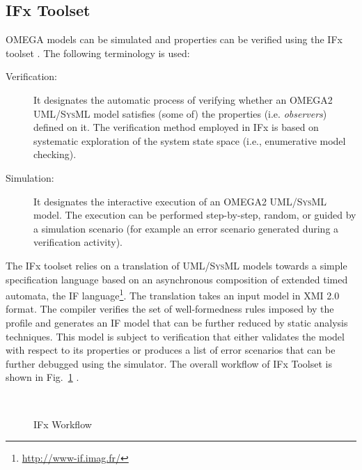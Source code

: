 \documentclass[a4paper,twoside]{article}
\def\sysml{\textsc{SysML}}
\def\uml{\textsc{UML}}
\begin{document}
\subsection{IFx Toolset}

\noindent OMEGA models can be simulated and properties can be verified using the IFx toolset \cite{test13}. The following terminology is used: 

\begin{description}
\item[Verification:] It designates  the  automatic  process  of  verifying  whether  an  OMEGA2  \uml{}/\sysml{} model  satisfies  (some  of)  the  properties  (i.e. \textit{observers})  defined  on  it.  The  verification  method employed in IFx is based on systematic exploration of the system state space (i.e., enumerative model checking). 
\item[Simulation:] It designates  the  interactive  execution  of  an  OMEGA2  \uml{}/\sysml{}  model.  The execution  can    be  performed  step-by-step,  random,  or  guided  by  a  simulation  scenario  (for example an error scenario generated during a verification activity). 
\end{description}

The IFx toolset relies on a translation of \uml{}/\sysml{} models towards a simple specification language based on an asynchronous composition of extended timed automata, the IF language\footnote{\url{http://www-if.imag.fr/}}. The translation takes an input model in XMI 2.0 format. 
The compiler verifies the set of well-formedness rules imposed by the profile and generates an IF model that can be further reduced by static analysis techniques. This model is subject to verification that either validates the model with respect to its properties or produces a list of error scenarios that can be further debugged using the simulator. The overall workflow  of IFx Toolset is shown in Fig.~\ref{fig:flow} \cite{test14}.


\begin{figure}[!h]
  \vspace{8cm}~
  \centering
  {}
  \caption{IFx Workflow}
  \label{fig:flow}
 \end{figure}
 
\end{document}
